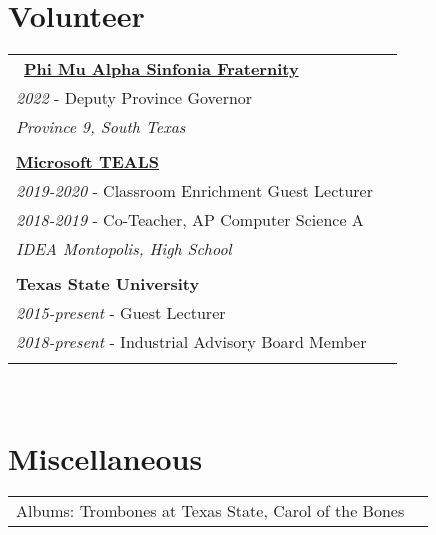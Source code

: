 \documentclass[10pt]{article} %
\newcommand\tab[1][1cm]{\hspace*{#1}}
\begin{document}
\begin{minipage}[t]{0.44\textwidth}
\begin{tabular}{rl}
\end{tabular}\\


\section{Volunteer} 

\begin{tabular}{ll}\
\href{https://province9.org}{\textbf{Phi Mu Alpha Sinfonia Fraternity}}\\
\tab\textit{2022} - Deputy Province Governor\\
\tab\tab\textit {Province 9, South Texas}\\
\\

\href{https://www.microsoft.com/en-us/teals}{\textbf{Microsoft TEALS}}\\
\tab\textit{2019-2020} - Classroom Enrichment Guest Lecturer\\
\tab\textit{2018-2019} - Co-Teacher, AP Computer Science A\\
\tab\tab\textit {IDEA Montopolis, High School}\\
\\

\textbf{Texas State University}\\
\tab\textit{2015-present} - Guest Lecturer\\
\tab\textit{2018-present} - Industrial Advisory Board Member\\
\\

\end{tabular}\\


\section{Miscellaneous} 

\begin{tabular}{ll}
Albums: Trombones at Texas State, Carol of the Bones \\
\end{tabular}\\

\end{minipage}
\end{document}
